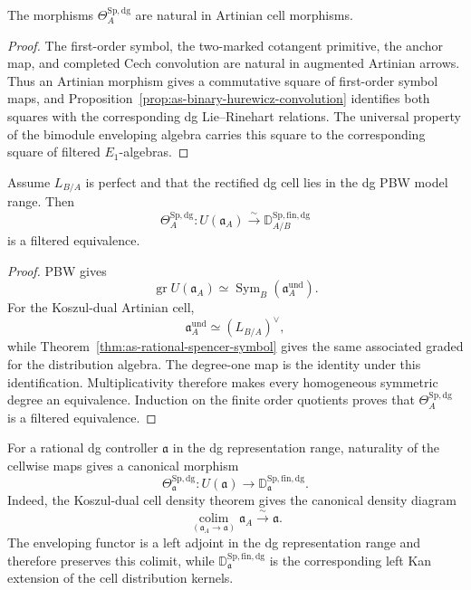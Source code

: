 \begin{proposition}
\label{prop:as-cellwise-pbw-natural}
The morphisms $\Theta_A^{\mathrm{Sp,dg}}$ are natural in Artinian cell
morphisms.
\end{proposition}

\begin{proof}
The first-order symbol, the two-marked cotangent primitive, the anchor map,
and completed Cech convolution are natural in augmented Artinian arrows.
Thus an Artinian morphism gives a commutative square of first-order symbol
maps, and Proposition~\ref{prop:as-binary-hurewicz-convolution} identifies
both squares with the corresponding dg Lie--Rinehart relations.  The
universal property of the bimodule enveloping algebra carries this square to
the corresponding square of filtered $E_1$-algebras.
\end{proof}

\begin{theorem}
\label{thm:as-rational-pbw-spencer-cell}
Assume $L_{B/A}$ is perfect and that the rectified dg cell lies in the dg PBW
model range.  Then
\[
\boxed{
    \Theta_A^{\mathrm{Sp,dg}}:
    U(\mathfrak a_A)
    \xrightarrow{\sim}
    \mathbb D_{A/B}^{\mathrm{Sp,fin,dg}}
}
\]
is a filtered equivalence.
\end{theorem}

\begin{proof}
PBW gives
\[
    \operatorname{gr}U(\mathfrak a_A)
    \simeq
    \operatorname{Sym}_B
    \left(
        \mathfrak a_A^{\mathrm{und}}
    \right).
\]
For the Koszul-dual Artinian cell,
\[
    \mathfrak a_A^{\mathrm{und}}
    \simeq
    (L_{B/A})^\vee,
\]
while
Theorem~\ref{thm:as-rational-spencer-symbol} gives the same associated
graded for the distribution algebra.  The degree-one map is the identity
under this identification.  Multiplicativity therefore makes every
homogeneous symmetric degree an equivalence.  Induction on the finite order
quotients proves that $\Theta_A^{\mathrm{Sp,dg}}$ is a filtered
equivalence.
\end{proof}

\begin{construction}
\label{con:as-controller-pbw-map}
For a rational dg controller $\mathfrak a$ in the dg representation range,
naturality of the cellwise maps gives a canonical morphism
\[
\boxed{
    \Theta_{\mathfrak a}^{\mathrm{Sp,dg}}:
    U(\mathfrak a)
    \longrightarrow
    \mathbb D_{\mathfrak a}^{\mathrm{Sp,fin,dg}}.
}
\]
Indeed, the Koszul-dual cell density theorem gives the canonical density
diagram
\[
    \operatorname*{colim}_{(\mathfrak a_A\to\mathfrak a)}
    \mathfrak a_A
    \xrightarrow{\sim}
    \mathfrak a.
\]
The enveloping functor is a left adjoint in the dg representation range and
therefore preserves this colimit, while
$\mathbb D_{\mathfrak a}^{\mathrm{Sp,fin,dg}}$ is the corresponding left
Kan extension of the cell distribution kernels.
\end{construction}

